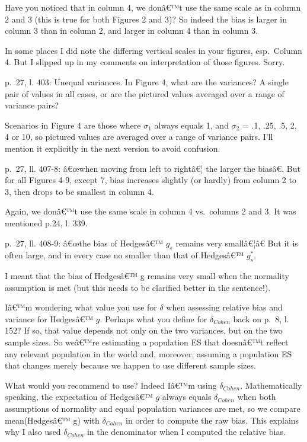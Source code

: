 \begin{appendix}
\color{blue} Have you noticed that in column 4, we donâ€™t use the same
scale as in column 2 and 3 (this is true for both Figures 2 and 3)? So
indeed the bias is larger in column 3 than in column 2, and larger in
column 4 than in column 3.

\color{brown} In some places I did note the differing vertical scales in
your figures, esp.~Column 4. But I slipped up in my comments on
interpretation of those figures. Sorry.

\color{black} p.~27, l. 403: Unequal variances. In Figure 4, what are
the variances? A single pair of values in all cases, or are the pictured
values averaged over a range of variance pairs?

\color{blue} Scenarios in Figure 4 are those where \(\sigma_1\) always
equals 1, and \(\sigma_2\) = .1, .25, .5, 2, 4 or 10, so pictured values
are averaged over a range of variance pairs. I'll mention it explicitly
in the next version to avoid confusion.

\color{black} p.~27, ll. 407-8: â€œwhen moving from left to rightâ€¦ the
larger the biasâ€. But for all Figures 4-9, except 7, bias increases
slightly (or hardly) from column 2 to 3, then drops to be smallest in
column 4.

\color{blue} Again, we donâ€™t use the same scale in column 4
vs.~columns 2 and 3. It was mentioned p.24, l. 339.

\color{black} p.~27, ll. 408-9: â€œthe bias of Hedgesâ€™ \(g_s\) remains
very smallâ€¦â€ But it is often large, and in every case no smaller
than that of Hedgesâ€™ \(g_s^*\).

\color{blue} I meant that the bias of Hedgesâ€™ g remains very small
when the normality assumption is met (but this needs to be clarified
better in the sentence!).

\color{black} Iâ€™m wondering what value you use for \(\delta\) when
assessing relative bias and variance for Hedgesâ€™ \(g\). Perhaps what
you define for \(\delta_{Cohen}\) back on p.~8, l. 152? If so, that
value depends not only on the two variances, but on the two sample
sizes. So weâ€™re estimating a population ES that doesnâ€™t reflect any
relevant population in the world and, moreover, assuming a population ES
that changes merely because we happen to use different sample sizes.

\color{blue} What would you recommend to use? Indeed Iâ€™m using
\(\delta_{Cohen}\). Mathematically speaking, the expectation of
Hedgesâ€™ \(g\) always equals \(\delta_{Cohen}\) when both assumptions
of normality and equal population variances are met, so we compare
mean(Hedgesâ€™ g) with \(\delta_{Cohen}\) in order to compute the raw
bias. This explains why I also used \(\delta_{Cohen}\) in the
denominator when I computed the relative bias.


\end{appendix}
